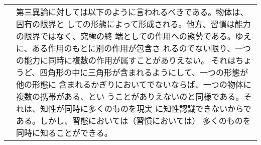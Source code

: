 \documentclass[10pt]{jsarticle} %
\begin{document}
\begin{longtable}{p{21em}p{21em}}
&


第三異論に対しては以下のように言われるべきである。物体は、固有の限界と
しての形態によって形成される。他方、習慣は能力の限界ではなく、究極の終
端としての作用への態勢である。ゆえに、ある作用のもとに別の作用が包含さ
れるのでない限り、一つの能力に同時に複数の作用が属すことがありえない。
それはちょうど、四角形の中に三角形が含まれるようにして、一つの形態が他の形態に
含まれるかぎりにおいてでないならば、一つの物体に複数の携帯がある、とい
うことがありえないのと同様である。それは、知性が同時に多くのものを現実
に知性認識できないからである。しかし、習態においては（習慣においては）
多くのものを同時に知ることができる。


\end{longtable}
\newpage


\begin{center}
{\Large {\bf }}\\
{\large }\\
{\footnotesize }\\
{\Large \\}
\end{center}
\end{document}
